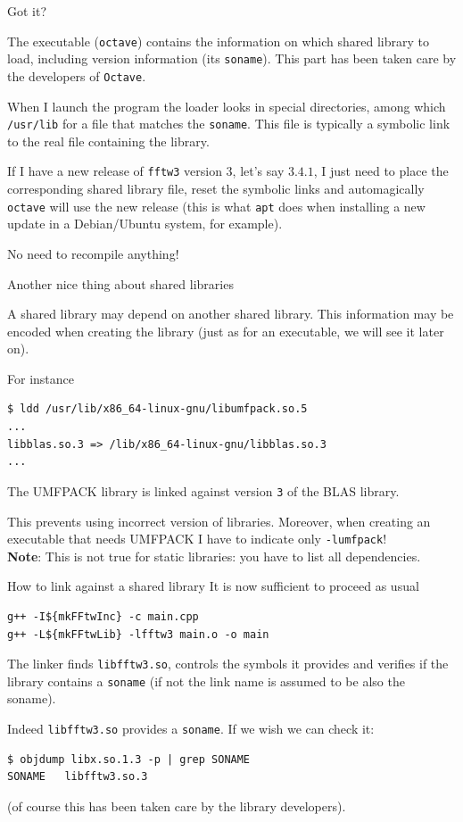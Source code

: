 \documentclass[10pt,aspectratio=169]{beamer}
\begin{document}
\begin{frame}{Got it?}  

  The executable (\texttt{octave}) contains the
  information on which shared library to load, including version
  information (its \texttt{soname}). This part has been taken care by the 
  developers of \texttt{Octave}.
  \smallskip

  When I launch the program the loader looks in special directories,
  among which \texttt{/usr/lib} for a file that matches the
  \texttt{soname}. This file is typically a symbolic link to the real
  file containing the library.  
  \medskip

  If I have a new release of \texttt{fftw3} version 3, let's say $3.4.1$,
  I just need to place the corresponding shared library file, reset the symbolic links and automagically \texttt{octave}
  will use the new release (this is what \texttt{apt} does when
  installing a new update in a Debian/Ubuntu system, for example).

  \smallskip

  No need to recompile anything!
\end{frame}


\begin{frame}[fragile]{Another nice thing about shared libraries} 

  A shared library may depend on another shared library. This information may be encoded  when creating the library
  (just as for an executable, we will see it later on).

  For instance
\begin{verbatim}
$ ldd /usr/lib/x86_64-linux-gnu/libumfpack.so.5
...
libblas.so.3 => /lib/x86_64-linux-gnu/libblas.so.3
...
\end{verbatim}
The UMFPACK library is linked against version
\texttt{3} of the BLAS library. \smallskip

This prevents using incorrect version of
libraries. Moreover, when creating an executable that needs UMFPACK I have to indicate only
\texttt{-lumfpack}! \\
\textbf{Note}: This is not true for static libraries: you have to list all dependencies.
\end{frame}

\begin{frame}[fragile]{How to link against a shared library}   
  It is now sufficient to proceed as usual
\begin{verbatim}
g++ -I${mkFFtwInc} -c main.cpp
g++ -L${mkFFtwLib} -lfftw3 main.o -o main
\end{verbatim}

The linker finds \texttt{libfftw3.so}, controls the symbols it
provides and verifies if the library contains a
\texttt{soname} (if not the link name is assumed to be also the
soname).

Indeed \texttt{libfftw3.so} provides a \texttt{soname}. If we wish we
can check it:
\begin{verbatim}
$ objdump libx.so.1.3 -p | grep SONAME
SONAME   libfftw3.so.3
\end{verbatim}
(of course this has been taken care by the library developers).
\end{frame}
\end{document}
